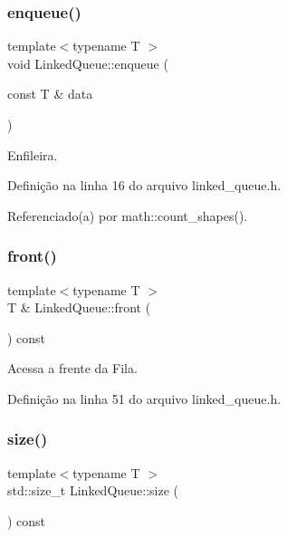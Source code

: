 \subsubsection{\texorpdfstring{enqueue()}{enqueue()}}
{\footnotesize\ttfamily template$<$typename T $>$ \\
void Linked\+Queue\+::enqueue (\begin{DoxyParamCaption}\item[{const T \&}]{data }\end{DoxyParamCaption})}



Enfileira. 



Definição na linha 16 do arquivo linked\+\_\+queue.\+h.



Referenciado(a) por math\+::count\+\_\+shapes().

\mbox{\label{classstructures_1_1_linked_queue_aa6d2f0263b390193d2aae72499aa00b4}} 
\subsubsection{\texorpdfstring{front()}{front()}}
{\footnotesize\ttfamily template$<$typename T $>$ \\
T \& Linked\+Queue\+::front (\begin{DoxyParamCaption}{ }\end{DoxyParamCaption}) const}



Acessa a frente da Fila. 



Definição na linha 51 do arquivo linked\+\_\+queue.\+h.

\mbox{\label{classstructures_1_1_linked_queue_a97af1a092fe5f7f15182bf93d1bc396d}} 
\subsubsection{\texorpdfstring{size()}{size()}}
{\footnotesize\ttfamily template$<$typename T $>$ \\
std\+::size\+\_\+t Linked\+Queue\+::size (\begin{DoxyParamCaption}{ }\end{DoxyParamCaption}) const}



